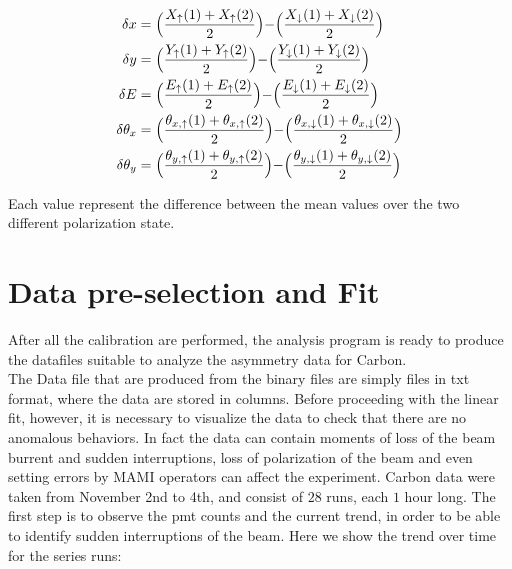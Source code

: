 \begin{equation}
\begin{split}
\delta {x} & = \Bigl(\dfrac{X_{\uparrow}(1) + X_{\uparrow}(2)}{2}\Bigl)  - \Bigl(\dfrac{X_{\downarrow}(1) + X_{\downarrow}(2)}{2}\Bigl)\\
\delta {y} & = \Bigl(\dfrac{Y_{\uparrow}(1) + Y_{\uparrow}(2)}{2}\Bigl)  - \Bigl(\dfrac{Y_{\downarrow}(1) + Y_{\downarrow}(2)}{2}\Bigl)\\
\delta {E} & = \Bigl(\dfrac{E_{\uparrow}(1) + E_{\uparrow}(2)}{2}\Bigl)  - \Bigl(\dfrac{E_{\downarrow}(1) + E_{\downarrow}(2)}{2}\Bigl)\\
\delta {\theta_{x}} & = \Bigl( \dfrac{\theta_{x,\uparrow}(1) + \theta_{x,\uparrow}(2)}{2} \Bigl) - \Bigl(\dfrac{\theta_{x,\downarrow}(1) + \theta_{x,\downarrow}(2)}{2} \Bigl)\\
\delta {\theta_{y}} & = \Bigl( \dfrac{\theta_{y,\uparrow}(1) + \theta_{y,\uparrow}(2)}{2} \Bigl) - \Bigl(\dfrac{\theta_{y,\downarrow}(1) + \theta_{y,\downarrow}(2)}{2} \Bigl)\\ 
\end{split}
\end{equation}

Each value represent the difference between the mean values over the two different polarization state.

\section{Data pre-selection and Fit}

After all the calibration are performed, the analysis program is ready to produce the datafiles suitable to analyze the asymmetry data for Carbon. \\
The Data file that are produced from the binary files are simply files in txt format, where the data are stored in columns. Before proceeding with the linear fit, however, it is necessary to visualize the data to check that there are no anomalous behaviors. In fact the data can contain moments of loss of the beam burrent and sudden interruptions, loss of polarization of the beam and even setting errors by MAMI operators can affect the experiment. Carbon data were taken from November 2nd to 4th, and consist of $28$ runs, each $1$ hour long.
The first step is to observe the pmt counts and the current trend, in order to be able to identify sudden interruptions of the beam. Here we show the trend over time for the series runs: 

